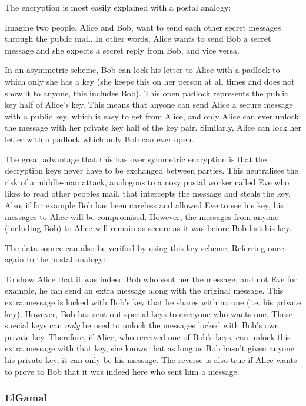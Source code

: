 The encryption is most easily explained with a postal analogy:

Imagine two people, Alice and Bob, want to send each other secret messages through the public
mail. In other words, Alice wants to send Bob a secret message and she expects a secret reply
from Bob, and vice versa. 

In an asymmetric scheme, Bob can lock his letter to Alice with a padlock to which only she has
a key (she keeps this on her person at all times and does not show it to anyone, this
includes Bob). This open padlock represents the public key half of Alice's key. This
means that anyone can send Alice a secure message with a public key, which is easy to
get from Alice, and only Alice can ever unlock the message with her private key half of the
key pair. Similarly, Alice can lock her letter with a padlock which only Bob can ever open.

The great advantage that this has over symmetric encryption is that the decryption keys never
have to be exchanged between parties. This neutralises the risk of a middle-man attack,
analogous to a nosy postal worker called Eve who likes to read other peoples mail, that
intercepts the message and steals the key.
Also, if for example Bob has been careless and allowed Eve to see his key, his messages to
Alice will be compromised. However, the messages from anyone (including Bob) to Alice will
remain as secure as it was before Bob lost his key.

The data source can also be verified by using this key scheme. Referring once again to the
postal analogy:

To show Alice that it was indeed Bob who sent her the message, and not Eve for example, he can
send an extra message along with the original message. This extra message is locked with Bob's
key that he shares with no one (i.e. his private key). However, Bob has sent out special keys
to everyone who wants one. These special keys can \emph{only} be used to unlock the messages locked with Bob's
own private key. Therefore, if Alice, who received one of Bob's keys, can unlock this extra
message with that key, she knows that as long as Bob hasn't given anyone his private key, it
can only be his message. The reverse is also true if Alice wants to prove to Bob that it was
indeed here who sent him a message. 

\subsubsection{ElGamal}
\label{sec:elgamal}

